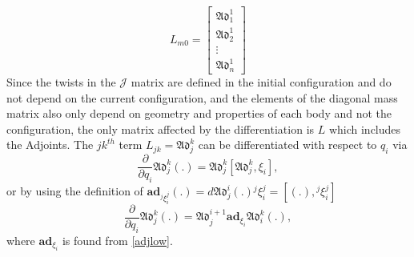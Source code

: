 \documentclass[lettersize,journal]{IEEEtran}
\def \Add {\mathfrak{Ad}}
\begin{document}
\begin{equation}
    L_{m0}=\begin{bmatrix} \Add_1^1\\ \Add^1_2 \\ \vdots \\ \Add^1_n \end{bmatrix}
\end{equation}
Since the twists in the $\mathcal{J}$ matrix are defined in the initial configuration and do not depend on the current configuration, and the elements of the diagonal mass matrix also only depend on geometry and properties of each body and not the configuration, the only matrix affected by the differentiation is $L$ which includes the Adjoints. The $jk^{th}$ term $L_{jk}=\Add_j^k$
 can be differentiated with respect to $q_i$ via
\begin{equation}
    \frac{\partial}{\partial q_i}\Add_j^k(.)%
    =\Add_j^k[\Add_j^k,\xi_i],
\end{equation}
or by using the definition of $\textbf{ad}_{{}^j\xi_i^{j}}(.)=d\Add_j^i(.) {}^j\xi_i^{j}=[(.),{}^j\xi_i^{j}]$
\begin{equation}
    \frac{\partial}{\partial q_i}{\Add}_j^k(.)=\Add_j^{i+1}\textbf{ad}_{\xi_i}\Add_i^k(.),
\end{equation}
where $\textbf{ad}_{\xi_i}$ is found from \eqref{adjlow}.
\end{document}

